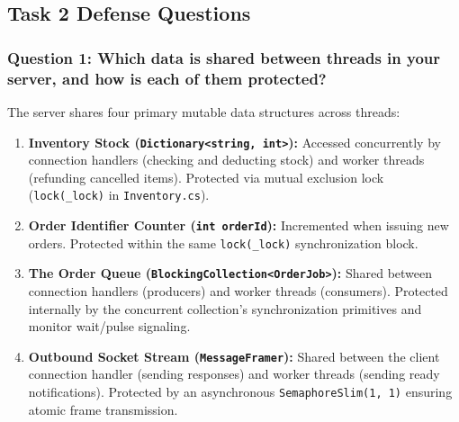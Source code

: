 \documentclass[12pt,a4paper]{article}
\begin{document}
\subsection{Task 2 Defense Questions}

\subsubsection{Question 1: Which data is shared between threads in your server, and how is each of them protected?}
The server shares four primary mutable data structures across threads:
\begin{enumerate}
    \item \textbf{Inventory Stock (\texttt{Dictionary<string, int>}):} Accessed concurrently by connection handlers (checking and deducting stock) and worker threads (refunding cancelled items). Protected via mutual exclusion lock (\texttt{lock(\_lock)} in \texttt{Inventory.cs}).
    \item \textbf{Order Identifier Counter (\texttt{int orderId}):} Incremented when issuing new orders. Protected within the same \texttt{lock(\_lock)} synchronization block.
    \item \textbf{The Order Queue (\texttt{BlockingCollection<OrderJob>}):} Shared between connection handlers (producers) and worker threads (consumers). Protected internally by the concurrent collection's synchronization primitives and monitor wait/pulse signaling.
    \item \textbf{Outbound Socket Stream (\texttt{MessageFramer}):} Shared between the client connection handler (sending responses) and worker threads (sending ready notifications). Protected by an asynchronous \texttt{SemaphoreSlim(1, 1)} ensuring atomic frame transmission.
\end{enumerate}
\end{document}
